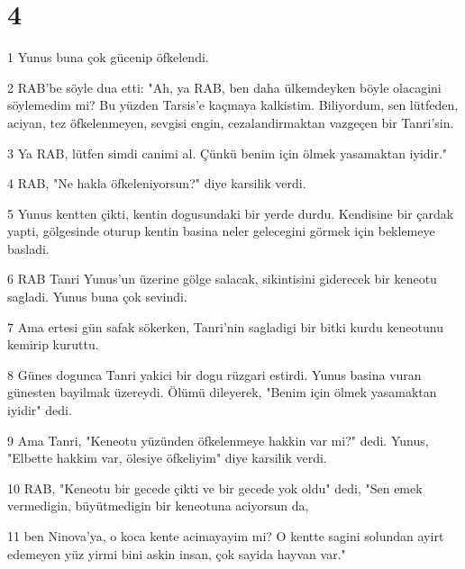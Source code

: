 \chapter{4}

\par 1 Yunus buna çok gücenip öfkelendi.
\par 2 RAB'be söyle dua etti: "Ah, ya RAB, ben daha ülkemdeyken böyle olacagini söylemedim mi? Bu yüzden Tarsis'e kaçmaya kalkistim. Biliyordum, sen lütfeden, aciyan, tez öfkelenmeyen, sevgisi engin, cezalandirmaktan vazgeçen bir Tanri'sin.
\par 3 Ya RAB, lütfen simdi canimi al. Çünkü benim için ölmek yasamaktan iyidir."
\par 4 RAB, "Ne hakla öfkeleniyorsun?" diye karsilik verdi.
\par 5 Yunus kentten çikti, kentin dogusundaki bir yerde durdu. Kendisine bir çardak yapti, gölgesinde oturup kentin basina neler gelecegini görmek için beklemeye basladi.
\par 6 RAB Tanri Yunus'un üzerine gölge salacak, sikintisini giderecek bir keneotu sagladi. Yunus buna çok sevindi.
\par 7 Ama ertesi gün safak sökerken, Tanri'nin sagladigi bir bitki kurdu keneotunu kemirip kuruttu.
\par 8 Günes dogunca Tanri yakici bir dogu rüzgari estirdi. Yunus basina vuran günesten bayilmak üzereydi. Ölümü dileyerek, "Benim için ölmek yasamaktan iyidir" dedi.
\par 9 Ama Tanri, "Keneotu yüzünden öfkelenmeye hakkin var mi?" dedi. Yunus, "Elbette hakkim var, ölesiye öfkeliyim" diye karsilik verdi.
\par 10 RAB, "Keneotu bir gecede çikti ve bir gecede yok oldu" dedi, "Sen emek vermedigin, büyütmedigin bir keneotuna aciyorsun da,
\par 11 ben Ninova'ya, o koca kente acimayayim mi? O kentte sagini solundan ayirt edemeyen yüz yirmi bini askin insan, çok sayida hayvan var."


